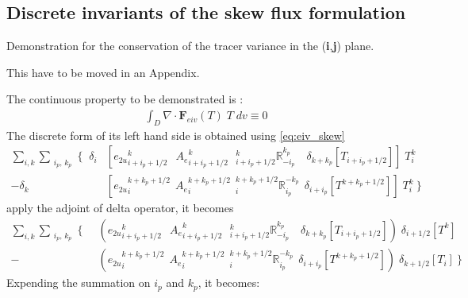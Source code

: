 \documentclass[../tex_main/NEMO_manual]{subfiles}
\begin{document}
$\ $\newpage      %
\subsection{Discrete invariants of the skew flux formulation}
\label{subsec:eiv_skew}


Demonstration for the conservation of the tracer variance in the (\textbf{i},\textbf{j}) plane. 

This have to be moved in an Appendix.

The continuous property to be demonstrated is :
\begin{align*}
\int_D \nabla \cdot \textbf{F}_{eiv}(T) \; T \;dv  \equiv 0
\end{align*}
The discrete form of its left hand side is obtained using \autoref{eq:eiv_skew}
\begin{align*}
 \sum\limits_{i,k} \sum_{\substack{i_p,\,k_p}}  \Biggl\{   \;\;
 \delta_i  &\left[                                                    
{e_{2u}}_{i+i_p+1/2}^{k}                                  \;\ \ {A_{e}}_{i+i_p+1/2}^{k} 
\ \ \ { _{i+i_p+1/2}^k \mathbb{R}_{-i_p}^{k_p} }   \quad \delta_{k+k_p}[T_{i+i_p+1/2}]         
   \right] \; T_i^k      \\
- \delta_k &\left[ 
{e_{2u}}_i^{k+k_p+1/2}                                     \ \ {A_{e}}_i^{k+k_p+1/2} 
\ \ { _i^{k+k_p+1/2} \mathbb{R}_{i_p}^{-k_p} }   \ \ \delta_{i+i_p}[T^{k+k_p+1/2}]   
   \right] \; T_i^k      \         \Biggr\}   
\end{align*}
apply the adjoint of delta operator, it becomes
\begin{align*}
 \sum\limits_{i,k} \sum_{\substack{i_p,\,k_p}}  \Biggl\{   \;\;
  &\left(                                                    
{e_{2u}}_{i+i_p+1/2}^{k}                                  \;\ \ {A_{e}}_{i+i_p+1/2}^{k} 
\ \ \ { _{i+i_p+1/2}^k \mathbb{R}_{-i_p}^{k_p} }   \quad \delta_{k+k_p}[T_{i+i_p+1/2}]         
   \right) \; \delta_{i+1/2}[T^{k}]      \\
- &\left( 
{e_{2u}}_i^{k+k_p+1/2}                                     \ \ {A_{e}}_i^{k+k_p+1/2} 
\ \ { _i^{k+k_p+1/2} \mathbb{R}_{i_p}^{-k_p} }   \ \ \delta_{i+i_p}[T^{k+k_p+1/2}]   
     \right) \; \delta_{k+1/2}[T_{i}]       \         \Biggr\}       
\end{align*}
Expending the summation on $i_p$ and $k_p$, it becomes:
\end{document}
